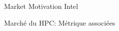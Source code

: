 %
\begin{Frame}{Market Motivation Intel}
      \begin{block}{Marché du HPC: Métrique associées}
      \end{block}   
\end{Frame}


